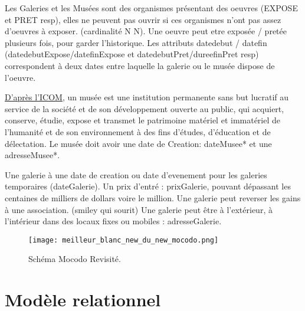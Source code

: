 \documentclass{article}
\begin{document}
Les Galeries et les Musées sont des organismes présentant des oeuvres (EXPOSE et PRET resp),
elles ne peuvent pas ouvrir si ces organismes n'ont pas assez d'oeuvres à exposer. 
(cardinalité N N).
Une oeuvre peut etre exposée / pretée plusieurs fois, pour garder l'historique.
Les attributs datedebut / datefin (datedebutExpose/datefinExpose et datedebutPret/dureefinPret resp) correspondent à deux dates entre laquelle la galerie ou le musée dispose de l'oeuvre.


\href{https://fr.wikipedia.org/wiki/Musée}{D'après l'ICOM}, un musée est une institution permanente sans but lucratif au service de la société et de son développement ouverte au public, qui acquiert, conserve, étudie, expose et transmet le patrimoine matériel et immatériel de l’humanité et de son environnement à des fins d'études, d'éducation et de délectation. 
Le musée doit avoir une date de Creation: dateMusee* et une adresseMusee*.

Une galerie à une date de creation ou date d'evenement pour les galeries temporaires (dateGalerie).
Un prix d'entré : prixGalerie, pouvant dépassant les centaines de milliers de dollars voire le million.
Une galerie peut reverser les gains à une association. (smiley qui sourit)
Une galerie peut être à l'extérieur, à l'intérieur dans des locaux fixes ou mobiles : adresseGalerie.




\begin{figure}[htp]
\centering
\texttt{[image: meilleur\_blanc\_new\_du\_new\_mocodo.png]}
\caption{\label{fig:MCD_last}Schéma Mocodo Revisité.}
\end{figure}


\clearpage


\section{Modèle relationnel}
\end{document}
